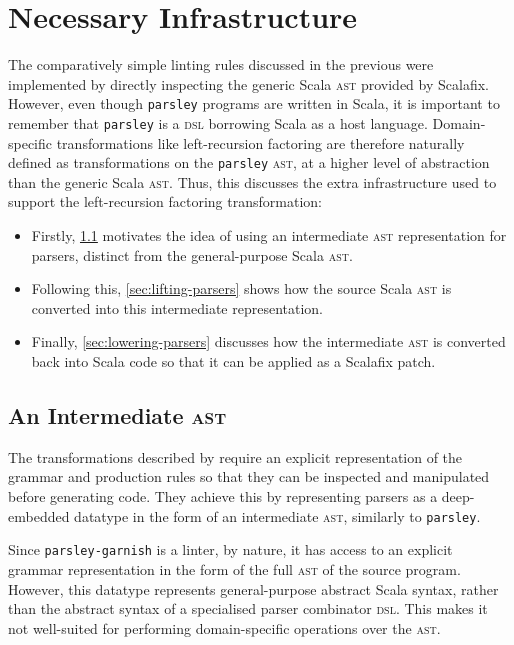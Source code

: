 \documentclass[../../main.tex]{subfiles}
\begin{document}
\section{Necessary Infrastructure}\label{sec:leftrec-infra}
The comparatively simple linting rules discussed in the previous  were implemented by directly inspecting the generic Scala \textsc{ast} provided by Scalafix.
However, even though \texttt{parsley} programs are written in Scala, it is important to remember that \texttt{parsley} is a \textsc{dsl} borrowing Scala as a host language.
Domain-specific transformations like left-recursion factoring are therefore naturally defined as transformations on the \texttt{parsley} \textsc{ast}, at a higher level of abstraction than the generic Scala \textsc{ast}.
Thus, this  discusses the extra infrastructure used to support the left-recursion factoring transformation:
\begin{itemize}
  \item Firstly, \cref{sec:parser-ast-motivation} motivates the idea of using an intermediate \textsc{ast} representation for parsers, distinct from the general-purpose Scala \textsc{ast}.
  \item Following this, \cref{sec:lifting-parsers} shows how the source Scala \textsc{ast} is converted into this intermediate representation.
  \item Finally, \cref{sec:lowering-parsers} discusses how the intermediate \textsc{ast} is converted back into Scala code so that it can be applied as a Scalafix patch.
\end{itemize}

\subsection{An Intermediate \textsc{ast}}\label{sec:parser-ast-motivation}
The transformations described by \textcite{baars_leftrec_2004} require an explicit representation of the grammar and production rules so that they can be inspected and manipulated before generating code.
They achieve this by representing parsers as a deep-embedded datatype in the form of an intermediate \textsc{ast}, similarly to \texttt{parsley}.

Since \texttt{parsley-garnish} is a linter, by nature, it has access to an explicit grammar representation in the form of the full  \textsc{ast} of the source program.
However, this datatype represents general-purpose abstract Scala syntax, rather than the abstract syntax of a specialised parser combinator \textsc{dsl}.
This makes it not well-suited for performing domain-specific operations over the \textsc{ast}.
\end{document}
